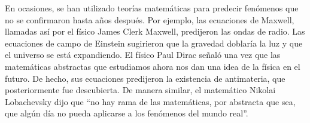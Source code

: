 \documentclass{article}
\begin{document}
En ocasiones, se han utilizado teor\'ias matem\'aticas para predecir fen\'omenos que
no se confirmaron hasta a\~nos despu\'es. Por ejemplo, las ecuaciones de Maxwell,
llamadas as\'i por el f\'isico James Clerk Maxwell, predijeron las ondas de radio.
Las ecuaciones de campo de Einstein sugirieron que la gravedad doblar\'ia la luz y
que el universo se est\'a expandiendo. El f\'isico Paul Dirac se\~nal\'o una vez que las
matem\'aticas abstractas que estudiamos ahora nos dan una idea de la f\'isica en el
futuro. De hecho, sus ecuaciones predijeron la existencia de antimateria, que
posteriormente fue descubierta. De manera similar, el matem\'atico Nikolai
Lobachevsky dijo que “no hay rama de las matem\'aticas, por abstracta que sea, que
alg\'un d\'ia no pueda aplicarse a los fen\'omenos del mundo real”.


\pagebreak
 

\end{document}
